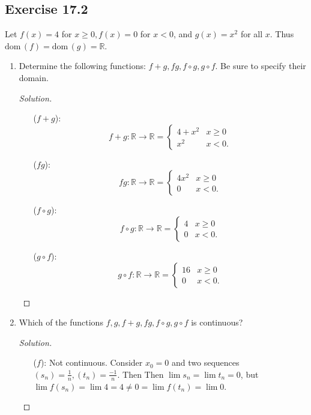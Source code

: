 \documentclass{article}
\newcommand*{\dom}{\ensuremath{\mathrm{dom}}\,}
\newcommand*{\R}{\ensuremath{\mathbb{R}}}
\begin{document}
\subsection*{Exercise 17.2}
Let $f(x)=4$ for $x\ge 0, f(x)=0$ for $x<0$, and $g(x)=x^2$ for all $x$. Thus $\dom(f)=\dom(g)=\R$.
\begin{enumerate}[label=(\alph*)]
    \item Determine the following functions: $f+g, fg, f\circ g, g\circ f$. Be sure to specify their 
    domain.
    \begin{proof}[Solution]\indent 
        \begin{enumerate}
            \item [($f+g$):] $$f+g:\R\to\R=\begin{cases}
                4+x^2 & x\ge 0 \\
                x^2 & x<0.
            \end{cases}$$
            \item [($fg$):] $$fg:\R\to\R=\begin{cases}
                4x^2 & x\ge 0 \\
                0 & x<0.
            \end{cases}$$
            \item [($f\circ g$):] $$f\circ g:\R\to\R=\begin{cases}
                4 & x\ge 0 \\
                0 & x<0.
            \end{cases}$$
            \item [($g\circ f$):] $$g\circ f:\R\to\R=\begin{cases}
                16 & x\ge 0 \\
                0 & x<0.
            \end{cases}$$
        \end{enumerate}
    \end{proof}

    \item Which of the functions $f,g,f+g,fg,f\circ g, g\circ f$ is continuous?
    \begin{proof}[Solution]\indent 
        \begin{enumerate}
            \item [($f$):]
            Not continuous. Consider $x_0=0$ and two sequences 
            $(s_n)=\frac{1}{n}, (t_n)=\frac{-1}{n}$. Then Then $\lim s_n=\lim t_n=0$, but
            $\lim f(s_n)=\lim 4 = 4\neq 0=\lim f(t_n) = \lim 0$.


\end{enumerate}
\end{proof}
\end{enumerate}
\end{document}
